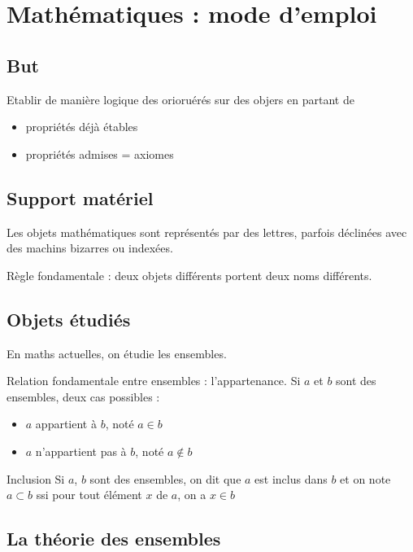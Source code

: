 
\section{Mathématiques : mode d'emploi}
\subsection{But}

Etablir de manière logique des orioruérés sur des objers en partant de 
\begin{itemize}
    \item propriétés déjà étables
    \item propriétés admises = axiomes
\end{itemize}

\subsection{Support matériel}

Les objets mathématiques sont représentés par des lettres, parfois déclinées avec des 
machins bizarres ou indexées. 

Règle fondamentale : deux objets différents portent deux noms différents. 

\subsection{Objets étudiés}

En maths actuelles, on étudie les ensembles. 

Relation fondamentale entre ensembles : l'appartenance. Si $a$ et $b$ sont des 
ensembles, deux cas possibles : 

\begin{itemize}
    \item $a$ appartient à $b$, noté $a \in b$
    \item $a$ n'appartient pas à $b$, noté $a \notin b$
\end{itemize}

\begin{definition}{Inclusion}{}
    Si $a$, $b$ sont des ensembles, on dit que $a$ est inclus dans $b$ et on note 
    $a \subset b$ ssi pour tout élément $x$ de $a$, on a $x \in b$
\end{definition}

\subsection{La théorie des ensembles}

